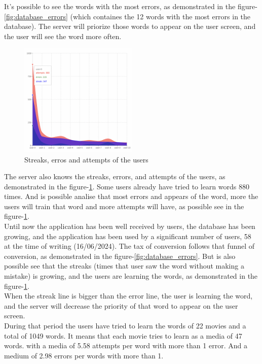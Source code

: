 \documentclass[12pt]{article}
\begin{document}
It's possible to see the words with the most errors, as demonstrated in the figure-\ref{fig:database_errors} (which containes the 12 words with the most errors in the database). The server will priorize those words to appear on the user screen, and the user will see the word more often. 
\begin{figure}[!h]
  \centering
  \caption{
  Streaks, erros and attempts of the users
  }
  \label{fig:database_users}
  \includegraphics[width=0.50\textwidth]{assets/31.png}
\end{figure}
The server also knows the streaks, errors, and attempts of the users, as demonstrated in the figure-\ref{fig:database_users}. Some users already have tried to learn words 880 times. And is possible analise that 
most errors and appears of the word, more the users will train that word and more attempts will have, as possible see in the figure-\ref{fig:database_users}. \\
Until now the application has been well received by users, the database has been growing, and the application has been used by a significant number of users, 58 at the time of writing (16/06/2024). The tax of conversion follows that funnel of conversion, as demonstrated in the figure-\ref{fig:database_errors}. 
But is also possible see that the streaks (times that user saw the word without making a mistake) is growing, and the users are learning the words, as demonstrated in the figure-\ref{fig:database_users}. \\
When the streak line is bigger than the error line, the user is learning the word, and the server will decrease the priority of that word to appear on the user screen. \\
During that period the users have tried to learn the words of 22 movies and a total of 1049 words. It means that each movie tries to learn as a media of 47 words. with a media of 5.58 attempts per word with more than 1 error. And a medium of 2.98 errors per words with more than 1. \\
\end{document}
